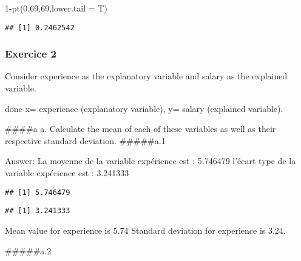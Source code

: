 \documentclass[
]{article}
\newenvironment{Shaded}{\begin{snugshade}}{\end{snugshade}}
\newcommand{\AttributeTok}[1]{\textcolor[rgb]{0.77,0.63,0.00}{#1}}
\newcommand{\DecValTok}[1]{\textcolor[rgb]{0.00,0.00,0.81}{#1}}
\newcommand{\FloatTok}[1]{\textcolor[rgb]{0.00,0.00,0.81}{#1}}
\newcommand{\FunctionTok}[1]{\textcolor[rgb]{0.00,0.00,0.00}{#1}}
\newcommand{\NormalTok}[1]{#1}
\newcommand{\SpecialCharTok}[1]{\textcolor[rgb]{0.00,0.00,0.00}{#1}}
\begin{document}
\begin{Shaded}
\begin{Highlighting}[]
\DecValTok{1}\SpecialCharTok{{-}}\FunctionTok{pt}\NormalTok{(}\FloatTok{0.69}\NormalTok{,}\DecValTok{69}\NormalTok{,}\AttributeTok{lower.tail =}\NormalTok{ T)}
\end{Highlighting}
\end{Shaded}

\begin{verbatim}
## [1] 0.2462542
\end{verbatim}

\hypertarget{exercice-2}{%
\subsubsection{Exercice 2}\label{exercice-2}}

Consider experience as the explanatory variable and salary as the
explained variable.

donc x= experience (explanatory variable), y= salary (explained
variable).

\#\#\#\#a a. Calculate the mean of each of these variables as well as
their respective standard deviation. \#\#\#\#\#a.1

Answer: La moyenne de la variable expérience est : 5.746479 l'écart type
de la variable expérience est : 3.241333

\begin{Shaded}
\end{Shaded}

\begin{verbatim}
## [1] 5.746479
\end{verbatim}

\begin{Shaded}
\end{Shaded}

\begin{verbatim}
## [1] 3.241333
\end{verbatim}

Mean value for experience is 5.74 Standard deviation for experience is
3.24.

\#\#\#\#\#a.2
\end{document}
